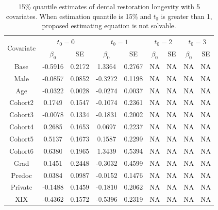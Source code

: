 \documentclass[12pt]{article}
\begin{document}
	\begin{table}[H]
		\caption{15\% quantile estimates of dental restoration longevity with 5 covariates. When estimation quantile is 15\% and $t_0$ is greater than 1, proposed estimating equation is not solvable. }
		\centering
		\begin{tabular}{|c|c|c|c|c|c|c|c|c|}
			\hline
			\multirow{2}{*}{Covariate} & \multicolumn{2}{c|}{$t_0=0$} & \multicolumn{2}{c|}{$t_0=1$} & \multicolumn{2}{c|}{$t_0=2$} & \multicolumn{2}{c|}{$t_0=3$}\\ 
			\cline{2-9}
			& $\beta_0$ & SE & $\beta_0$ & SE & $\beta_0$ & SE & $\beta_0$ & SE\\
			\hline\hline
			Base & -0.5916 & 0.2172 & 1.3364 & 0.2767 & NA & NA & NA & NA \\ 
			Male & -0.0857 & 0.0852 & -0.3272 & 0.1198 & NA & NA & NA & NA \\ 
			Age & -0.0322 & 0.0028 & -0.0274 & 0.0037 & NA & NA & NA & NA \\ 
			Cohort2 & 0.1749 & 0.1547 & -0.1074 & 0.2361 & NA & NA & NA & NA \\ 
			Cohort3 & -0.0078 & 0.1334 & -0.1831 & 0.2002 & NA & NA & NA & NA \\ 
			Cohort4 & 0.2685 & 0.1653 & 0.0697 & 0.2237 & NA & NA & NA & NA \\ 
			Cohort5 & 0.5137 & 0.1673 & 0.1587 & 0.2299 & NA & NA & NA & NA \\ 
			Cohort6 & 0.6380 & 0.1965 & 1.3439 & 0.5394 & NA & NA & NA & NA \\ 
			Grad & 0.1451 & 0.2448 & -0.3032 & 0.4599 & NA & NA & NA & NA \\ 
			Predoc & 0.0384 & 0.0987 & -0.0152 & 0.1476 & NA & NA & NA & NA \\ 
			Private & -0.1488 & 0.1459 & -0.1810 & 0.2062 & NA & NA & NA & NA \\ 
			XIX & -0.4362 & 0.1572 & -0.5396 & 0.2319 & NA & NA & NA & NA \\ 
			\hline
		\end{tabular}
	\end{table}		
\end{document}

